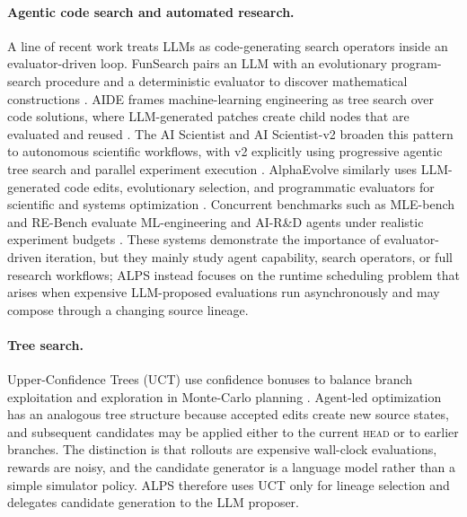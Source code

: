 \documentclass{article}
\newcommand{\alps}{ALPS\xspace}
\newcommand{\HEAD}{\textsc{head}\xspace}
\begin{document}
\paragraph{Agentic code search and automated research.}
A line of recent work treats LLMs as code-generating search operators inside an evaluator-driven loop. FunSearch pairs an LLM with an evolutionary program-search procedure and a deterministic evaluator to discover mathematical constructions \citep{funsearch}. AIDE frames machine-learning engineering as tree search over code solutions, where LLM-generated patches create child nodes that are evaluated and reused \citep{aide}. The AI Scientist and AI Scientist-v2 broaden this pattern to autonomous scientific workflows, with v2 explicitly using progressive agentic tree search and parallel experiment execution \citep{ai_scientist,aiscientistv2}. AlphaEvolve similarly uses LLM-generated code edits, evolutionary selection, and programmatic evaluators for scientific and systems optimization \citep{alphaevolve}. Concurrent benchmarks such as MLE-bench and RE-Bench evaluate ML-engineering and AI-R\&D agents under realistic experiment budgets \citep{mlebench,rebench}. These systems demonstrate the importance of evaluator-driven iteration, but they mainly study agent capability, search operators, or full research workflows; \alps instead focuses on the runtime scheduling problem that arises when expensive LLM-proposed evaluations run asynchronously and may compose through a changing source lineage.

\paragraph{Tree search.}
Upper-Confidence Trees (UCT) use confidence bonuses to balance branch exploitation and exploration in Monte-Carlo planning \citep{uct}. Agent-led optimization has an analogous tree structure because accepted edits create new source states, and subsequent candidates may be applied either to the current \HEAD or to earlier branches. The distinction is that rollouts are expensive wall-clock evaluations, rewards are noisy, and the candidate generator is a language model rather than a simple simulator policy. \alps therefore uses UCT only for lineage selection and delegates candidate generation to the LLM proposer.
\end{document}
